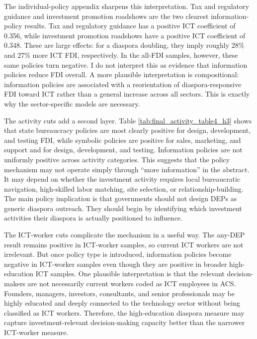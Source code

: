 \documentclass[12pt]{article}
\begin{document}
The individual-policy appendix sharpens this interpretation. Tax and regulatory guidance and investment promotion roadshows are the two clearest information-policy results. Tax and regulatory guidance has a positive ICT coefficient of 0.356, while investment promotion roadshows have a positive ICT coefficient of 0.348. These are large effects: for a diaspora doubling, they imply roughly 28\% and 27\% more ICT FDI, respectively. In the all-FDI samples, however, these same policies turn negative. I do not interpret this as evidence that information policies reduce FDI overall. A more plausible interpretation is compositional: information policies are associated with a reorientation of diaspora-responsive FDI toward ICT rather than a general increase across all sectors. This is exactly why the sector-specific models are necessary.

The activity cuts add a second layer. Table \ref{tab:final_activity_table4_h3} shows that state bureaucracy policies are most clearly positive for design, development, and testing FDI, while symbolic policies are positive for sales, marketing, and support and for design, development, and testing. Information policies are not uniformly positive across activity categories. This suggests that the policy mechanism may not operate simply through ``more information'' in the abstract. It may depend on whether the investment activity requires local bureaucratic navigation, high-skilled labor matching, site selection, or relationship-building. The main policy implication is that governments should not design DEPs as generic diaspora outreach. They should begin by identifying which investment activities their diaspora is actually positioned to influence.

The ICT-worker cuts complicate the mechanism in a useful way. The any-DEP result remains positive in ICT-worker samples, so current ICT workers are not irrelevant. But once policy type is introduced, information policies become negative in ICT-worker samples even though they are positive in broader high-education ICT samples. One plausible interpretation is that the relevant decision-makers are not necessarily current workers coded as ICT employees in ACS. Founders, managers, investors, consultants, and senior professionals may be highly educated and deeply connected to the technology sector without being classified as ICT workers. Therefore, the high-education diaspora measure may capture investment-relevant decision-making capacity better than the narrower ICT-worker measure.
\end{document}
